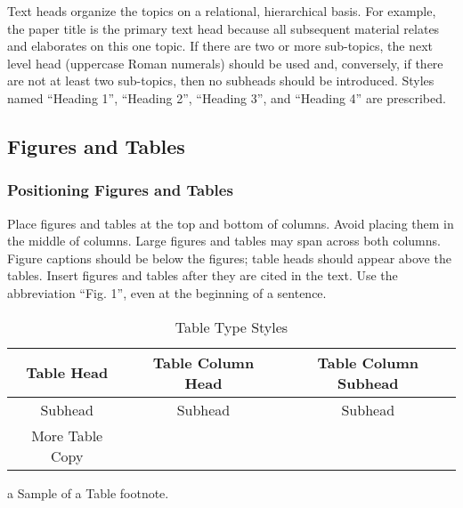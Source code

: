 \documentclass[a4paper,conference]{IEEEtran}
\begin{document}
Text heads organize the topics on a relational, hierarchical basis. For example, the paper title is the primary text head because all subsequent material relates and elaborates on this one topic. If there are two or more sub-topics, the next level head (uppercase Roman numerals) should be used and, conversely, if there are not at least two sub-topics, then no subheads should be introduced. Styles named “Heading 1”, “Heading 2”, “Heading 3”, and “Heading 4” are prescribed.

\subsection{Figures and Tables}
\subsubsection{Positioning Figures and Tables}
Place figures and tables at the top and bottom of columns. Avoid placing them in the middle of columns. Large figures and tables may span across both columns. Figure captions should be below the figures; table heads should appear above the tables. Insert figures and tables after they are cited in the text. Use the abbreviation “Fig. 1”, even at the beginning of a sentence.

\begin{table}[htbp]
    \caption{Table Type Styles}
    \begin{threeparttable}
        \begin{tabular}{|c|c|c|}
            \hline
            \textbf{Table Head} & \textbf{Table Column Head} & \textbf{Table Column Subhead} \\
            \hline
            Subhead & Subhead & Subhead \\
            \hline
            More Table Copy & & \\
            \hline
        \end{tabular}
        \begin{tablenotes}
            \item[a] Sample of a Table footnote.
        \end{tablenotes}
    \end{threeparttable}
    \label{tab:table}
\end{table}

\end{document}
